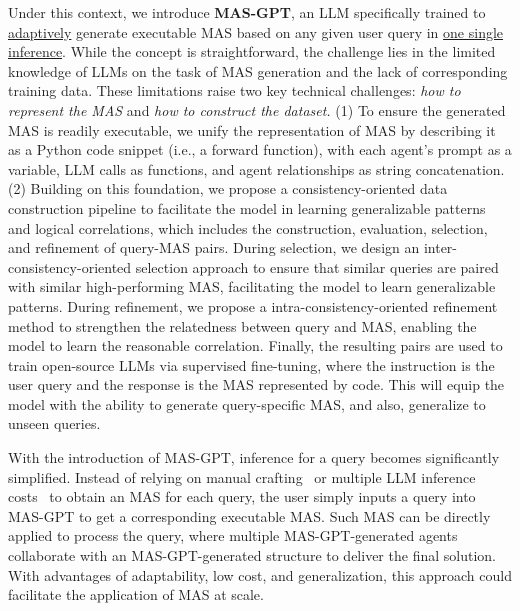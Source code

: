 \documentclass{article}
\theoremstyle{plain}
\theoremstyle{definition}
\theoremstyle{remark}
\begin{document}
Under this context, we introduce \textbf{MAS-GPT}, an LLM specifically trained to \underline{adaptively} generate executable MAS based on any given user query in \underline{one single inference}.
While the concept is straightforward, the challenge lies in the limited knowledge of LLMs on the task of MAS generation and the lack of corresponding training data. These limitations raise two key technical challenges: \textit{how to represent the MAS} and \textit{how to construct the dataset.}
(1) To ensure the generated MAS is readily executable, we unify the representation of MAS by describing it as a Python code snippet (i.e., a forward function), with each agent’s prompt as a variable, LLM calls as functions, and agent relationships as string concatenation.
(2) Building on this foundation, we propose a consistency-oriented data construction pipeline to facilitate the model in learning generalizable patterns and logical correlations, which includes the construction, evaluation, selection, and refinement of query-MAS pairs.
During selection, we design an inter-consistency-oriented selection approach to ensure that similar queries are paired with similar high-performing MAS, facilitating the model to learn generalizable patterns.
During refinement, we propose a intra-consistency-oriented refinement method to strengthen the relatedness between query and MAS, enabling the model to learn the reasonable correlation.
Finally, the resulting pairs are used to train open-source LLMs via supervised fine-tuning, where the instruction is the user query and the response is the MAS represented by code.
This will equip the model with the ability to generate query-specific MAS, and also, generalize to unseen queries.

With the introduction of MAS-GPT, inference for a query becomes significantly simplified.
Instead of relying on manual crafting~\cite{hongmetagpt,qian2024chatdev,chen2023agentverse} or multiple LLM inference costs~\cite{liu2024dynamic,zhugegptswarm} to obtain an MAS for each query, the user simply inputs a query into MAS-GPT to get a corresponding executable MAS.
Such MAS can be directly applied to process the query, where multiple MAS-GPT-generated agents collaborate with an MAS-GPT-generated structure to deliver the final solution.
With advantages of adaptability, low cost, and generalization, this approach could facilitate the application of MAS at scale.
\end{document}
